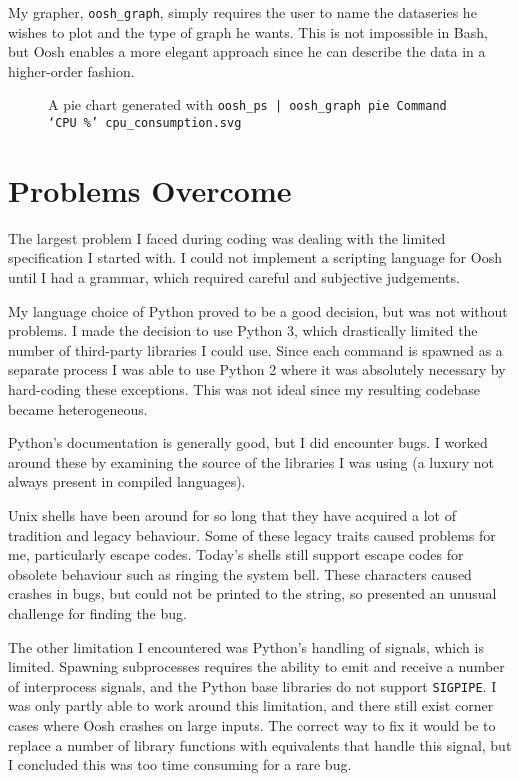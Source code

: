 \documentclass[12pt,twoside,notitlepage]{report}
\begin{document}
My grapher, {\tt oosh\_graph}, simply requires the user to name the
dataseries he wishes to plot and the type of graph he wants. This is
not impossible in Bash, but Oosh enables a more elegant approach since
he can describe the data in a higher-order fashion.

\begin{figure}[h]
  \caption{A pie chart generated with {\tt oosh\_ps | oosh\_graph pie Command `CPU \%' cpu\_consumption.svg}}
  \centering
\end{figure}

\section{Problems Overcome}

The largest problem I faced during coding was dealing with the limited
specification I started with. I could not implement a scripting
language for Oosh until I had a grammar, which required careful and
subjective judgements.

My language choice of Python proved to be a good decision, but was not
without problems. I made the decision to use Python 3, which
drastically limited the number of third-party libraries I could
use. Since each command is spawned as a separate process I was able to
use Python 2 where it was absolutely necessary by hard-coding these
exceptions. This was not ideal since my resulting codebase became
heterogeneous.

Python's documentation is generally good, but I did encounter bugs. I
worked around these by examining the source of the libraries I was
using (a luxury not always present in compiled languages).

Unix shells have been around for so long that they have acquired a lot
of tradition and legacy behaviour. Some of these legacy traits caused
problems for me, particularly escape codes. Today's shells still
support escape codes for obsolete behaviour such as ringing the system
bell. These characters caused crashes in bugs, but could not be
printed to the string, so presented an unusual challenge for finding
the bug.

The other limitation I encountered was Python's handling of signals,
which is limited. Spawning subprocesses requires the ability to emit
and receive a number of interprocess signals, and the Python base
libraries do not support {\tt SIGPIPE}. I was only partly able to work
around this limitation, and there still exist corner cases where Oosh
crashes on large inputs. The correct way to fix it would be to replace
a number of library functions with equivalents that handle this
signal, but I concluded this was too time consuming for a rare bug.
\end{document}
